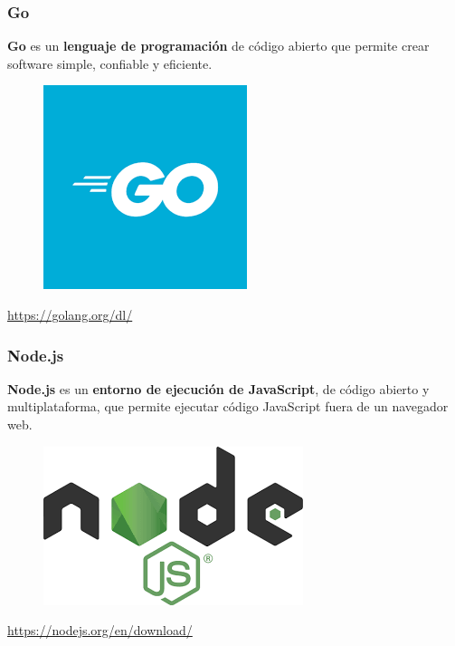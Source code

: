 \documentclass{beamer}
\begin{document}
	\begin{frame}
		\frametitle{Go}
		\textbf{Go} es un \textbf{lenguaje de programación} de código abierto que permite crear software simple, confiable y eficiente.
		\begin{figure}[h]
			\includegraphics[scale=.3]{go}
			\centering
		\end{figure}
		\begin{center}
			\tiny{\url{https://golang.org/dl/}}
		\end{center}
	\end{frame}
	
	\begin{frame}
		\frametitle{Node.js}
		\textbf{Node.js} es un \textbf{entorno de ejecución de JavaScript}, de código abierto y multiplataforma, que permite ejecutar código JavaScript fuera de un navegador web.
		\begin{figure}[h]
			\includegraphics[scale=.3]{nodejs}
			\centering
		\end{figure}
		\begin{center}
			\tiny{\url{https://nodejs.org/en/download/}}
		\end{center}
	\end{frame}
	
\end{document}

